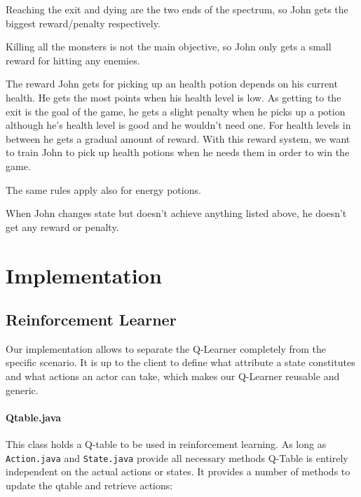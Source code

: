 \documentclass[a4paper,10pt]{scrartcl}
\begin{document}
Reaching the exit and dying are the two ends of the spectrum, so John gets the biggest reward/penalty respectively.

Killing all the monsters is not the main objective, so John only gets a small reward for hitting any enemies.

The reward John gets for picking up an health potion depends on his current health. He gets the most points when his health level is low. As getting to the exit is the goal of the game, he gets a slight penalty when he picks up a potion although he's health level is good and he wouldn't need one. 
For health levels in between he gets a gradual amount of reward. 
With this reward system, we want to train John to pick up health potions when he needs them in order to win the game.
 
The same rules apply also for energy potions. 

When John changes state but doesn't achieve anything listed above, he doesn't get any reward or penalty. 


\section{Implementation}\label{sec:implementation}
\subsection{Reinforcement Learner}
Our implementation allows to separate the Q-Learner completely from the specific scenario. It is up to the client to define what attribute a state constitutes and what actions an actor can take, which makes our Q-Learner reusable and generic. 

\paragraph{Qtable.java}
This class holds a Q-table to be used in reinforcement learning. As long as \verb|Action.java| and \verb|State.java| provide all necessary methods Q-Table is entirely independent on the actual actions or states. It provides a number of methods to update the qtable and retrieve actions:
\end{document}
